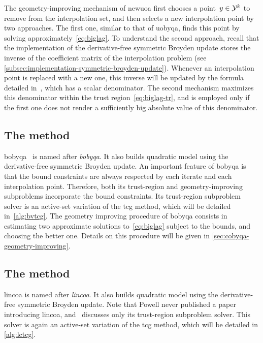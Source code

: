 The geometry-improving mechanism of \gls{newuoa} first chooses a point~$y \in \xpt[k]$ to remove from the interpolation set, and then selects a new interpolation point by two approaches.
The first one, similar to that of \gls{uobyqa}, finds this point by solving approximately~\cref{eq:biglag}.
To understand the second approach, recall that the implementation of the derivative-free symmetric Broyden update stores the inverse of the coefficient matrix of the interpolation problem (see \cref{subsec:implementation-symmetric-broyden-update}).
Whenever an interpolation point is replaced with a new one, this inverse will be updated by the formula detailed in~\cite[Eq.~(2.12)]{Powell_2004c}, which has a scalar denominator.
The second mechanism maximizes this denominator within the trust region~\cref{eq:biglag-tr}, and is employed only if the first one does not render a sufficiently big absolute value of this denominator.

\subsection{The  method}
\label{subsec:bobyqa}

\Gls{bobyqa}~\cite{Powell_2009} is named after \emph{\glsdesc{bobyqa}}.
It also builds quadratic model using the derivative-free symmetric Broyden update.
An important feature of \gls{bobyqa} is that the bound constraints are always respected  by each iterate and each interpolation point.
Therefore, both its trust-region and geometry-improving subproblems incorporate the bound constraints.
Its trust-region subproblem solver is an active-set variation of the \gls{tcg} method, which will be detailed in~\cref{alg:bvtcg}.
The geometry improving procedure of \gls{bobyqa} consists in estimating two approximate solutions to~\cref{eq:biglag} subject to the bounds, and choosing the better one.
Details on this procedure will be given in \cref{sec:cobyqa-geometry-improving}.

\subsection{The  method}
\label{subsec:lincoa}

\Gls{lincoa} is named after \emph{\glsdesc{lincoa}}.
It also builds quadratic model using the derivative-free symmetric Broyden update.
Note that Powell never published a paper introducing \gls{lincoa}, and~\cite{Powell_2015} discusses only its trust-region subproblem solver.
This solver is again an active-set variation of the \gls{tcg} method, which will be detailed in \cref{alg:lctcg}.

